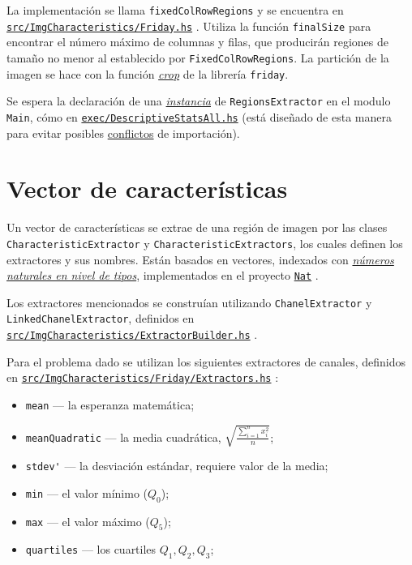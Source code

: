 \documentclass{article}
\newcommand\refcode[2]{ \href{#1}{\texttt{#2}} }
\begin{document}
La implementación se llama \verb|fixedColRowRegions| y se encuentra en\\ \refcode{\Friday}{src/ImgCharacteristics/Friday.hs}. Utiliza la función \verb|finalSize| para encontrar el número máximo de columnas y filas, que producirán regiones de tamaño no menor al establecido por \verb|FixedColRowRegions|. La partición de la imagen se hace con la función \href{https://hackage.haskell.org/package/friday-0.2.2.0/docs/Vision-Image-Transform.html}{\emph{crop}} de la librería \verb|friday|.

Se espera la declaración de una \href{https://downloads.haskell.org/~ghc/7.0.1/docs/html/users_guide/type-class-extensions.html}{\emph{instancia}} de \verb|RegionsExtractor| en el modulo \verb|Main|, cómo en \refcode{\ExecAll}{exec/DescriptiveStatsAll.hs} (está diseñado de esta manera para evitar posibles \href{https://wiki.haskell.org/Multiple_instances}{conflictos} de importación).

\section{Vector de características}

Un vector de características se extrae de una región de imagen por las clases \verb|CharacteristicExtractor| y \verb|CharacteristicExtractors|, los cuales definen los extractores y sus nombres. Están basados en vectores, indexados con \href{https://wiki.haskell.org/Type_arithmetic}{\emph{números naturales en nivel de tipos}}, implementados en el proyecto \refcode{\Nat}{Nat}.

Los extractores mencionados se construían utilizando \verb|ChanelExtractor| y \verb|LinkedChanelExtractor|, definidos en \\ \refcode{\ExtractorBuilder}{src/ImgCharacteristics/ExtractorBuilder.hs}.


Para el problema dado se utilizan los siguientes extractores de canales, definidos en \refcode{\Extractors}{src/ImgCharacteristics/Friday/Extractors.hs}:
\begin{itemize}
\item \verb|mean| --- la esperanza matemática;
\item \verb|meanQuadratic| --- la media cuadrática, $\sqrt{\frac{\sum\limits_{i=1}^n x_i^2}{n}}$;
\item \verb|stdev'| --- la desviación estándar, requiere valor de la media;
\item \verb|min| --- el valor mínimo ($Q_0$);
\item \verb|max| --- el valor máximo ($Q_5$);
\item \verb|quartiles| --- los cuartiles $Q_1, Q_2, Q_3$;
\end{itemize}
\end{document}
